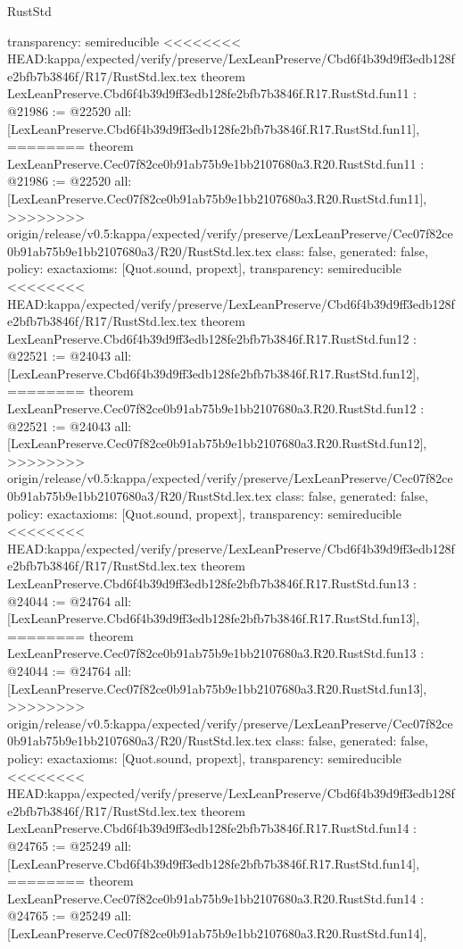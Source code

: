 \begin{lexlean}{RustStd}
\begin{coremodule}
{\begin{coremodule}
{{{{{{{{{{{{{{  transparency: semireducible
}
<<<<<<<< HEAD:kappa/expected/verify/preserve/LexLeanPreserve/Cbd6f4b39d9ff3edb128fe2bfb7b3846f/R17/RustStd.lex.tex
theorem LexLeanPreserve.Cbd6f4b39d9ff3edb128fe2bfb7b3846f.R17.RustStd.fun11 : @21986 := @22520 {
  all: [LexLeanPreserve.Cbd6f4b39d9ff3edb128fe2bfb7b3846f.R17.RustStd.fun11],
========
theorem LexLeanPreserve.Cec07f82ce0b91ab75b9e1bb2107680a3.R20.RustStd.fun11 : @21986 := @22520 {
  all: [LexLeanPreserve.Cec07f82ce0b91ab75b9e1bb2107680a3.R20.RustStd.fun11],
>>>>>>>> origin/release/v0.5:kappa/expected/verify/preserve/LexLeanPreserve/Cec07f82ce0b91ab75b9e1bb2107680a3/R20/RustStd.lex.tex
  class: false,
  generated: false,
  policy: exact{axioms: [Quot.sound, propext]},
  transparency: semireducible
}
<<<<<<<< HEAD:kappa/expected/verify/preserve/LexLeanPreserve/Cbd6f4b39d9ff3edb128fe2bfb7b3846f/R17/RustStd.lex.tex
theorem LexLeanPreserve.Cbd6f4b39d9ff3edb128fe2bfb7b3846f.R17.RustStd.fun12 : @22521 := @24043 {
  all: [LexLeanPreserve.Cbd6f4b39d9ff3edb128fe2bfb7b3846f.R17.RustStd.fun12],
========
theorem LexLeanPreserve.Cec07f82ce0b91ab75b9e1bb2107680a3.R20.RustStd.fun12 : @22521 := @24043 {
  all: [LexLeanPreserve.Cec07f82ce0b91ab75b9e1bb2107680a3.R20.RustStd.fun12],
>>>>>>>> origin/release/v0.5:kappa/expected/verify/preserve/LexLeanPreserve/Cec07f82ce0b91ab75b9e1bb2107680a3/R20/RustStd.lex.tex
  class: false,
  generated: false,
  policy: exact{axioms: [Quot.sound, propext]},
  transparency: semireducible
}
<<<<<<<< HEAD:kappa/expected/verify/preserve/LexLeanPreserve/Cbd6f4b39d9ff3edb128fe2bfb7b3846f/R17/RustStd.lex.tex
theorem LexLeanPreserve.Cbd6f4b39d9ff3edb128fe2bfb7b3846f.R17.RustStd.fun13 : @24044 := @24764 {
  all: [LexLeanPreserve.Cbd6f4b39d9ff3edb128fe2bfb7b3846f.R17.RustStd.fun13],
========
theorem LexLeanPreserve.Cec07f82ce0b91ab75b9e1bb2107680a3.R20.RustStd.fun13 : @24044 := @24764 {
  all: [LexLeanPreserve.Cec07f82ce0b91ab75b9e1bb2107680a3.R20.RustStd.fun13],
>>>>>>>> origin/release/v0.5:kappa/expected/verify/preserve/LexLeanPreserve/Cec07f82ce0b91ab75b9e1bb2107680a3/R20/RustStd.lex.tex
  class: false,
  generated: false,
  policy: exact{axioms: [Quot.sound, propext]},
  transparency: semireducible
}
<<<<<<<< HEAD:kappa/expected/verify/preserve/LexLeanPreserve/Cbd6f4b39d9ff3edb128fe2bfb7b3846f/R17/RustStd.lex.tex
theorem LexLeanPreserve.Cbd6f4b39d9ff3edb128fe2bfb7b3846f.R17.RustStd.fun14 : @24765 := @25249 {
  all: [LexLeanPreserve.Cbd6f4b39d9ff3edb128fe2bfb7b3846f.R17.RustStd.fun14],
========
theorem LexLeanPreserve.Cec07f82ce0b91ab75b9e1bb2107680a3.R20.RustStd.fun14 : @24765 := @25249 {
  all: [LexLeanPreserve.Cec07f82ce0b91ab75b9e1bb2107680a3.R20.RustStd.fun14],
}}}}}}}}}}}}}}}}}}
\end{coremodule}}
\end{coremodule}
\end{lexlean}
